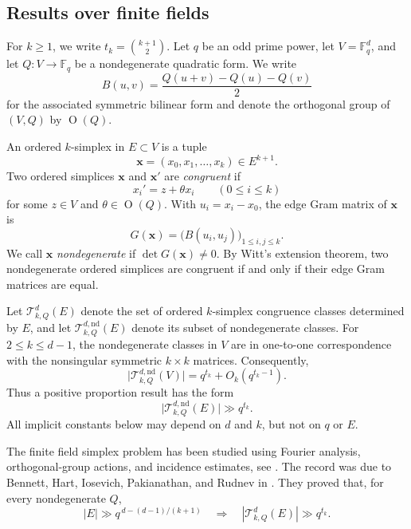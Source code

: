 \documentclass[11pt]{article}
\theoremstyle{remark}
\numberwithin{equation}{section}
\newcommand{\Fq}{\mathbb F_q}
\newcommand{\cT}{\mathcal T}
\newcommand{\Orth}{\operatorname O}
\newcommand{\1}{\mathbf 1}
\begin{document}
\subsection{Results over finite fields}
For \(k\geq1\), we write $t_k=\binom{k+1}{2}$. Let \(q\) be an odd prime power, let \(V=\Fq^d\), and let
\(Q:V\to\Fq\) be a nondegenerate quadratic form.  We write
\[
 B(u,v)=\frac{Q(u+v)-Q(u)-Q(v)}2
\]
for the associated symmetric bilinear form and denote the orthogonal
group of \((V,Q)\) by \(\Orth(Q)\).

An ordered \(k\)-simplex in \(E\subset V\) is a tuple
\[
        \mathbf x=(x_0,x_1,\ldots,x_k)\in E^{k+1}.
\]
Two ordered simplices \(\mathbf x\) and \(\mathbf x'\) are
\emph{congruent} if
\[
        x_i'=z+\theta x_i\qquad(0\leq i\leq k)
\]
for some \(z\in V\) and \(\theta\in\Orth(Q)\).  With
\(u_i=x_i-x_0\), the edge Gram matrix of \(\mathbf x\) is
\[
        G(\mathbf x)
        =
        \bigl(B(u_i,u_j)\bigr)_{1\leq i,j\leq k}.
\]
We call \(\mathbf x\) \emph{nondegenerate} if
\(\det G(\mathbf x)\neq0\).  By Witt's extension theorem, two
nondegenerate ordered simplices are congruent if and only if their edge
Gram matrices are equal.

Let \(\cT^d_{k,Q}(E)\) denote the set of ordered \(k\)-simplex
congruence classes determined by \(E\), and let
\(\cT^{d,\mathrm{nd}}_{k,Q}(E)\) denote its subset of nondegenerate
classes.  For \(2\leq k\leq d-1\), the nondegenerate classes in \(V\)
are in one-to-one correspondence with the nonsingular symmetric
\(k\times k\) matrices.  Consequently,
\[
 \bigl|\cT^{d,\mathrm{nd}}_{k,Q}(V)\bigr|
 =
 q^{t_k}+O_k(q^{t_k-1}).
\]
Thus a positive proportion result has the form
\[
 \bigl|\cT^{d,\mathrm{nd}}_{k,Q}(E)\bigr|
 \gg q^{t_k}.
\]
All implicit constants below may depend on \(d\) and \(k\), but not
on \(q\) or \(E\).

The finite field simplex problem has been studied using Fourier
analysis, orthogonal-group actions, and incidence estimates, see \cite{BHIPR, 
BIP, CEHIK, McDonald, Parshall, PhamFixedSide, VinhBilinear, VinhKaleidoscopic}. The record was due to Bennett,
Hart, Iosevich, Pakianathan, and Rudnev in \cite{BHIPR}. They proved that, for
every nondegenerate \(Q\),
\begin{equation}\label{eq:BHIPR-intro}
 |E|\gg q^{\,d-(d-1)/(k+1)}
 \quad\Longrightarrow\quad
 |\cT^d_{k,Q}(E)|\gg q^{t_k}.
\end{equation}
\end{document}
